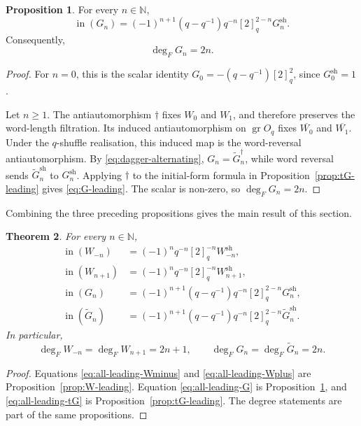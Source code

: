 \documentclass[11pt]{extarticle}
\newtheorem{theorem}{Theorem}[section]
\theoremstyle{definition}
\newtheorem{proposition}[theorem]{Proposition}
\theoremstyle{remark}
\numberwithin{equation}{section}
\newcommand{\N}{\mathbb N}
\newcommand{\Oq}{O_q}
\newcommand{\gr}{\operatorname{gr}}
\newcommand{\init}{\operatorname{in}}
\newcommand{\sh}{\mathrm{sh}}
\begin{document}
\begin{proposition}
\label{prop:G-leading}
For every \(n\in\N\),
\begin{equation}
\label{eq:G-leading}
\init(G_n)
 =
 (-1)^{n+1}(q-q^{-1})q^{-n}[2]_q^{2-n}G_n^{\sh}.
\end{equation}
Consequently,
\[
        \deg_F G_n=2n .
\]
\end{proposition}

\begin{proof}
For \(n=0\), this is the scalar identity
\(G_0=-(q-q^{-1})[2]_q^2\), since \(G_0^{\sh}=1\).

Let \(n\geq1\).  The antiautomorphism \(\dagger\) fixes \(W_0\) and
\(W_1\), and therefore preserves the word-length filtration.  Its induced
antiautomorphism on \(\gr\Oq\) fixes \(\overline{W_0}\) and
\(\overline{W_1}\).  Under the \(q\)-shuffle realisation, this induced map
is the word-reversal antiautomorphism.  By
\eqref{eq:dagger-alternating}, \(G_n=\widetilde G_n^\dagger\), while word
reversal sends \(\widetilde G_n^{\sh}\) to \(G_n^{\sh}\).  Applying
\(\dagger\) to the initial-form formula in
Proposition~\ref{prop:tG-leading} gives \eqref{eq:G-leading}.  The scalar
is non-zero, so \(\deg_FG_n=2n\).
\end{proof}

Combining the three preceding propositions gives the main result of this
section.

\begin{theorem}
\label{thm:all-leading}
For every \(n\in\N\),
\begin{align}
\init(W_{-n})
 &=(-1)^nq^{-n}[2]_q^{-n}W_{-n}^{\sh},
\label{eq:all-leading-Wminus}\\
\init(W_{n+1})
 &=(-1)^nq^{-n}[2]_q^{-n}W_{n+1}^{\sh},
\label{eq:all-leading-Wplus}\\
\init(G_n)
 &=(-1)^{n+1}(q-q^{-1})q^{-n}[2]_q^{2-n}G_n^{\sh},
\label{eq:all-leading-G}\\
\init(\widetilde G_n)
 &=(-1)^{n+1}(q-q^{-1})q^{-n}[2]_q^{2-n}
   \widetilde G_n^{\sh}.
\label{eq:all-leading-tG}
\end{align}
In particular,
\[
        \deg_F W_{-n}=\deg_F W_{n+1}=2n+1,
        \qquad
        \deg_F G_n=\deg_F\widetilde G_n=2n .
\]
\end{theorem}

\begin{proof}
Equations \eqref{eq:all-leading-Wminus} and \eqref{eq:all-leading-Wplus}
are Proposition~\ref{prop:W-leading}.  Equation
\eqref{eq:all-leading-G} is Proposition~\ref{prop:G-leading}, and
\eqref{eq:all-leading-tG} is Proposition~\ref{prop:tG-leading}.  The degree
statements are part of the same propositions.
\end{proof}
\end{document}
